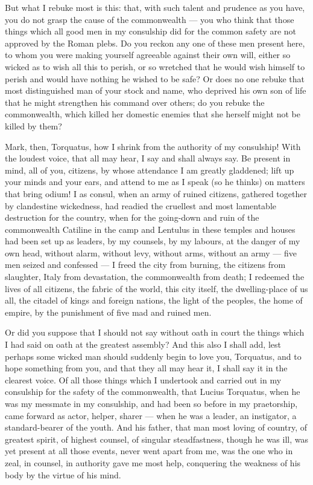  But what I rebuke most is this: that, with such talent and prudence as you have, you do not grasp the cause of the commonwealth --- you who think that those things which all good men in my consulship did for the common safety are not approved by the Roman plebs. Do you reckon any one of these men present here, to whom you were making yourself agreeable against their own will, either so wicked as to wish all this to perish, or so wretched that he would wish himself to perish and would have nothing he wished to be safe? Or does no one rebuke that most distinguished man of your stock and name, who deprived his own son of life that he might strengthen his command over others; do you rebuke the commonwealth, which killed her domestic enemies that she herself might not be killed by them?

 Mark, then, Torquatus, how I shrink from the authority of my consulship! With the loudest voice, that all may hear, I say and shall always say. Be present in mind, all of you, citizens, by whose attendance I am greatly gladdened; lift up your minds and your ears, and attend to me as I speak (so he thinks) on matters that bring odium! I as consul, when an army of ruined citizens, gathered together by clandestine wickedness, had readied the cruellest and most lamentable destruction for the country, when for the going-down and ruin of the commonwealth Catiline in the camp and Lentulus in these temples and houses had been set up as leaders, by my counsels, by my labours, at the danger of my own head, without alarm, without levy, without arms, without an army --- five men seized and confessed --- I freed the city from burning, the citizens from slaughter, Italy from devastation, the commonwealth from death; I redeemed the lives of all citizens, the fabric of the world, this city itself, the dwelling-place of us all, the citadel of kings and foreign nations, the light of the peoples, the home of empire, by the punishment of five mad and ruined men.

 Or did you suppose that I should not say without oath in court the things which I had said on oath at the greatest assembly? And this also I shall add, lest perhaps some wicked man should suddenly begin to love you, Torquatus, and to hope something from you, and that they all may hear it, I shall say it in the clearest voice. Of all those things which I undertook and carried out in my consulship for the safety of the commonwealth, that Lucius Torquatus, when he was my messmate in my consulship, and had been so before in my praetorship, came forward as actor, helper, sharer --- when he was a leader, an instigator, a standard-bearer of the youth. And his father, that man most loving of country, of greatest spirit, of highest counsel, of singular steadfastness, though he was ill, was yet present at all those events, never went apart from me, was the one who in zeal, in counsel, in authority gave me most help, conquering the weakness of his body by the virtue of his mind.

